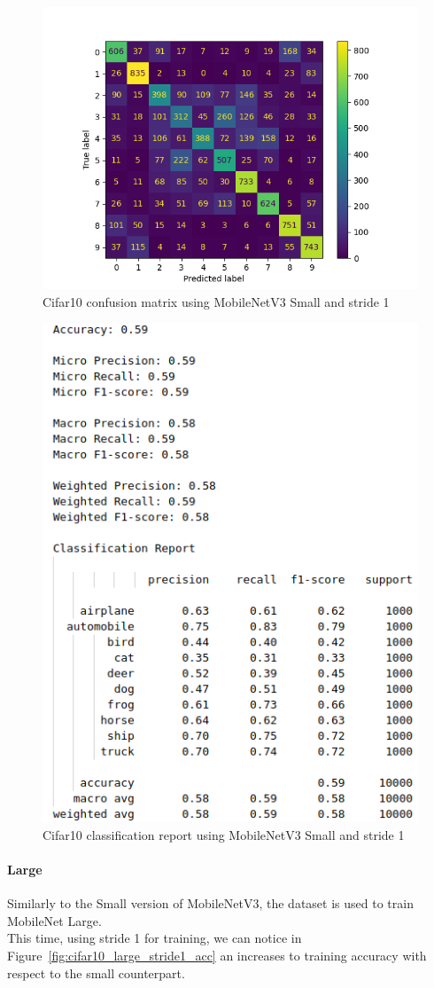 \documentclass[12pt, letterpaper, twoside]{article}
\begin{document}
\begin{figure}[H]
	\centering
	\includegraphics[width=.7\textwidth]{cm_cifar10_small_s1.png}
	\caption{Cifar10 confusion matrix using MobileNetV3 Small and stride 1}
	\label{fig:cifar10_small_stride1_cm}
\end{figure}

\begin{figure}[H]
	\centering
	\includegraphics[width=.6\textwidth]{report_cifar10_small_stride1.png}
	\caption{Cifar10 classification report using MobileNetV3 Small and stride 1}
	\label{fig:cifar10_small_stride1_report}
\end{figure}


\paragraph{Large} 
Similarly to the Small version of MobileNetV3, the dataset is used to train MobileNet Large. \\
This time, using stride 1 for training, we can notice in Figure~\ref{fig:cifar10_large_stride1_acc} an increases to training accuracy with respect to the small counterpart.\\
\end{document}
